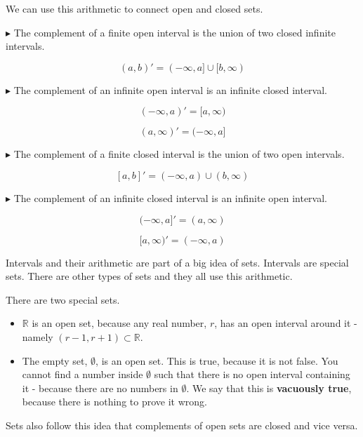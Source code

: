 \documentclass{ximera}
\begin{document}
We can use this arithmetic to connect open and closed sets.

$\blacktriangleright$ The complement of a finite open interval is the union of two closed infinite intervals.

\[    (a,b)'  = (-\infty, a] \cup [b, \infty)          \]



$\blacktriangleright$ The complement of an infinite open interval is an infinite closed interval.

\[     (-\infty, a)' = [a, \infty)          \]

\[     (a, \infty)' = (-\infty, a]          \]



$\blacktriangleright$ The complement of a finite closed interval is the union of two open intervals.

\[    [a,b]'  = (-\infty, a) \cup (b, \infty)          \]



$\blacktriangleright$ The complement of an infinite closed interval is an infinite open interval.

\[     (-\infty, a]' = (a, \infty)          \]

\[     [a, \infty)' = (-\infty, a)          \]









Intervals and their arithmetic are part of a big idea of sets.  Intervals are special sets.  There are other types of sets and they all use this arithmetic.

There are two special sets.

\begin{itemize}
\item $\mathbb{R}$  is an open set, because any real number, $r$, has an open interval around it - namely $(r-1, r+1) \subset \mathbb{R}$.
\item The empty set, $\emptyset$, is an open set.  This is true, because it is not false.  You cannot find a number inside $\emptyset$ such that there is no open interval containing it - because there are no numbers in $\emptyset$.  We say that this is \textbf{vacuously true}, because there is nothing to prove it wrong.
\end{itemize}





Sets also follow this idea that complements of open sets are closed and vice versa.
\end{document}
